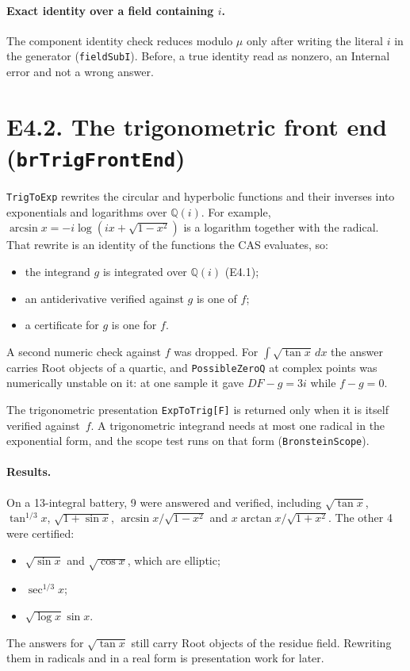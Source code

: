 \documentclass[11pt]{article}
\theoremstyle{definition}
\theoremstyle{remark}
\newcommand{\Q}{\mathbb{Q}}
\newcommand{\code}[1]{\texttt{#1}}
\begin{document}
\paragraph{Exact identity over a field containing $i$.} The component identity
check reduces modulo $\mu$ only after writing the literal $i$ in the generator
(\code{fieldSubI}). Before, a true identity read as nonzero, an Internal error
and not a wrong answer.

\section*{E4.2. The trigonometric front end (\code{brTrigFrontEnd})}

\code{TrigToExp} rewrites the circular and hyperbolic functions and their
inverses into exponentials and logarithms over $\Q(i)$. For example,
$\arcsin x=-i\log(ix+\sqrt{1-x^2})$ is a logarithm together with the radical.
That rewrite is an identity of the functions the CAS evaluates, so:
\begin{itemize}
\item the integrand $g$ is integrated over $\Q(i)$ (E4.1);
\item an antiderivative verified against $g$ is one of $f$;
\item a certificate for $g$ is one for $f$.
\end{itemize}

A second numeric check against $f$ was dropped. For
$\int\sqrt{\tan x}\,dx$ the answer carries Root objects of a quartic, and
\code{PossibleZeroQ} at complex points was numerically unstable on it: at one
sample it gave $D F-g=3i$ while $f-g=0$.

The trigonometric presentation \code{ExpToTrig[F]} is returned only when it is
itself verified against~$f$. A trigonometric integrand needs at most one radical
in the exponential form, and the scope test runs on that form
(\code{BronsteinScope}).

\paragraph{Results.} On a 13-integral battery, 9 were answered and verified,
including $\sqrt{\tan x}$, $\tan^{1/3}x$, $\sqrt{1+\sin x}$,
$\arcsin x/\sqrt{1-x^2}$ and $x\arctan x/\sqrt{1+x^2}$. The other 4 were
certified:
\begin{itemize}
\item $\sqrt{\sin x}$ and $\sqrt{\cos x}$, which are elliptic;
\item $\sec^{1/3}x$;
\item $\sqrt{\log x}\sin x$.
\end{itemize}
The answers for $\sqrt{\tan x}$ still carry Root objects of the residue field.
Rewriting them in radicals and in a real form is presentation work for later.
\end{document}
